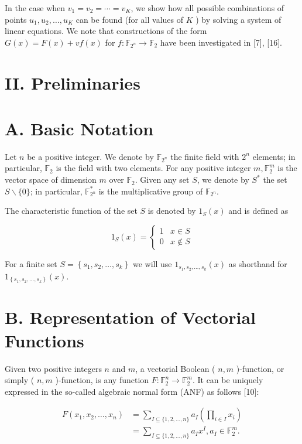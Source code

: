 \documentclass[10pt]{article}
\begin{document}
In the case when $v_{1}=v_{2}=\cdots=v_{K}$, we show how all possible combinations of points $u_{1}, u_{2}, \ldots, u_{K}$ can be found (for all values of $K$ ) by solving a system of linear equations. We note that constructions of the form $G(x)=F(x)+v f(x)$ for $f: \mathbb{F}_{2^{n}} \rightarrow \mathbb{F}_{2}$ have been investigated in [7], [16].

\section*{II. Preliminaries}
\section*{A. Basic Notation}
Let $n$ be a positive integer. We denote by $\mathbb{F}_{2^{n}}$ the finite field with $2^{n}$ elements; in particular, $\mathbb{F}_{2}$ is the field with two elements. For any positive integer $m, \mathbb{F}_{2}^{m}$ is the vector space of dimension $m$ over $\mathbb{F}_{2}$. Given any set $S$, we denote by $S^{*}$ the set $S \backslash\{0\}$; in particular, $\mathbb{F}_{2^{n}}^{*}$ is the multiplicative group of $\mathbb{F}_{2^{n}}$.

The characteristic function of the set $S$ is denoted by $1_{S}(x)$ and is defined as

$$
1_{S}(x)= \begin{cases}1 & x \in S \\ 0 & x \notin S\end{cases}
$$

For a finite set $S=\left\{s_{1}, s_{2}, \ldots, s_{k}\right\}$ we will use $1_{s_{1}, s_{2}, \ldots, s_{k}}(x)$ as shorthand for $1_{\left\{s_{1}, s_{2}, \ldots, s_{k}\right\}}(x)$.

\section*{B. Representation of Vectorial Functions}
Given two positive integers $n$ and $m$, a vectorial Boolean ( $n, m$ )-function, or simply ( $n, m$ )-function, is any function $F: \mathbb{F}_{2}^{n} \rightarrow \mathbb{F}_{2}^{m}$. It can be uniquely expressed in the so-called algebraic normal form (ANF) as follows [10]:

$$
\begin{aligned}
F\left(x_{1}, x_{2}, \ldots, x_{n}\right) & =\sum_{I \subseteq\{1,2, \ldots, n\}} a_{I}\left(\prod_{i \in I} x_{i}\right) \\
& =\sum_{I \subseteq\{1,2, \ldots, n\}} a_{I} x^{I}, a_{I} \in \mathbb{F}_{2}^{m} .
\end{aligned}
$$
\end{document}
